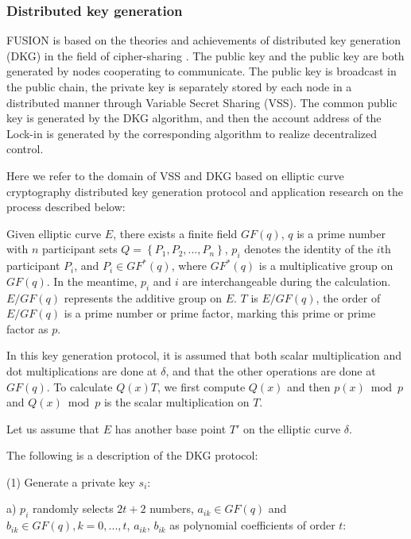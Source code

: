 \documentclass[a4paper,12pt]{article}
\begin{document}
\subsubsection{Distributed key generation}

FUSION is based on the theories and achievements of distributed key generation (DKG) in the field of cipher-sharing \citep{Feldman 1987}. The public key and the public key are both generated by nodes cooperating to communicate. The public key is broadcast in the public chain, the private key is separately stored by each node in a distributed manner through Variable Secret Sharing (VSS). The common public key is generated by the DKG algorithm, and then the account address of the Lock-in is generated by the corresponding algorithm to realize decentralized control.

Here we refer to the domain of VSS and DKG based on elliptic curve cryptography distributed key generation protocol and application \citep{Wang2007} research on the process described below:

Given elliptic curve $E$, there exists a finite field $GF(q)$, $q$ is a prime number with $n$ participant sets $Q = \left\{ {{P_1},{P_2}, .. .,{P_n}} \right\}$, ${p_i}$ denotes the identity of the $i$th participant $P_{i}$, and ${P_i} \in G{F^*} \left( q \right)$, where $G{F^*}\left(q \right)$ is a multiplicative group on $GF \left( q \right)$. In the meantime, ${p_i}$ and $i$ are interchangeable during the calculation. $E/GF\left( q \right)$ represents the additive group on $E$. $T$ is $E/GF\left( q \right)$, the order of $E/GF\left(q \right)$ is a prime number or prime factor, marking this prime or prime factor as $p$.

In this key generation protocol, it is assumed that both scalar multiplication and dot multiplications are done at $\delta$, and that the other operations are done at $GF \left(q \right)$. To calculate $Q \left(x \right) T$, we first compute $Q \left(x \right)$ and then $p$$\left(x \right) \bmod p $ and $Q \left(x \right) \bmod p$ is the scalar multiplication on $T$.

Let us assume that $E$ has another base point $T'$ on the elliptic curve $\delta$.

The following is a description of the DKG protocol:

(1) Generate a private key ${s_i}$:

a) $p_{i}$ randomly selects $2t + 2$ numbers, $a_{ik} \in GF (q)$ and $b_{ik} \in GF (q), k = 0,..., t$, $a_{ik}$, $b_{ik}$ as polynomial coefficients of order $t$:
\end{document}
